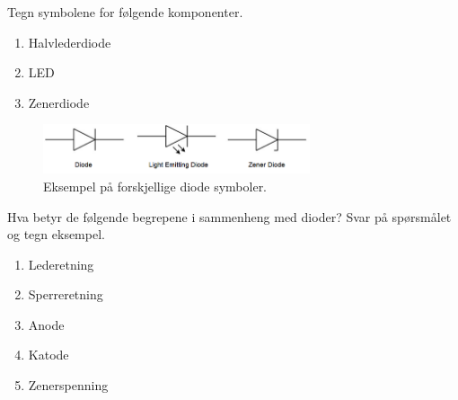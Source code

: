 
\begin{question}[name=Spørsmål, topic=dioder]
	Tegn symbolene for følgende komponenter.
	\begin{enumerate}[label=\roman*]
		\item Halvlederdiode
		\item LED
		\item Zenerdiode
	\end{enumerate}
\end{question}
	

\begin{solution}[name=Løsningsforslag oppgave]
	\begin{figure}[H]
		\centering
		\includegraphics[width=0.7\textwidth]{diode/figurer/oppgave1.png}
		\caption{Eksempel på forskjellige diode symboler.}
		\label{fig:diodeSymb}
	\end{figure}
\end{solution}


\begin{question}[name=Spørsmål, topic=dioder]
Hva betyr de følgende begrepene i sammenheng med dioder? Svar på spørsmålet og tegn eksempel.
	\begin{enumerate}[label=\roman*]
		\item Lederetning
		\item Sperreretning
		\item Anode
		\item Katode
		\item Zenerspenning
	\end{enumerate}
\end{question}



